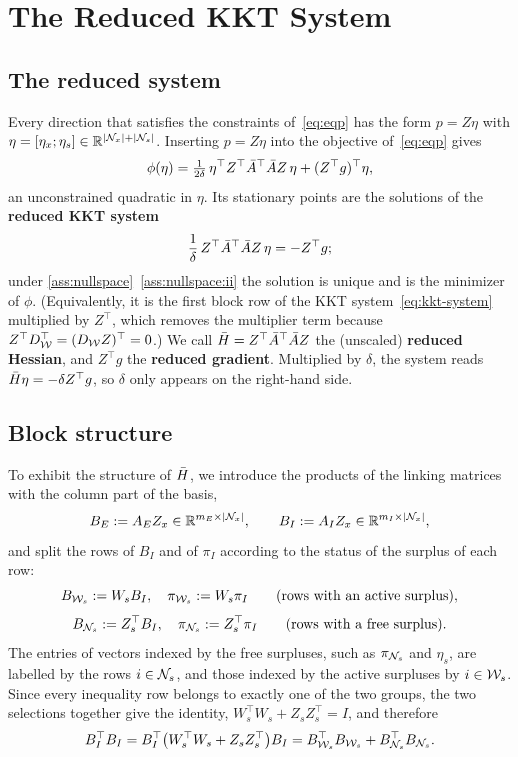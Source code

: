 \section{The Reduced KKT System}
\label{sec:reduced}

\subsection{The reduced system}

Every direction that satisfies the constraints of~\eqref{eq:eqp} has the form
$p = Z\eta$ with $\eta = [\eta_x;\eta_s]\in\mathbb{R}^{|\mathcal{N}_x|+|\mathcal{N}_s|}$. Inserting $p = Z\eta$ into the
objective of~\eqref{eq:eqp} gives
\[
\phi(\eta) = \tfrac{1}{2\delta}\,\eta^\top Z^\top\bar{A}^\top\bar{A} Z\,\eta + (Z^\top g)^\top\eta,
\]
an unconstrained quadratic in $\eta$. Its stationary points are the solutions of the
\textbf{reduced KKT system}
\begin{equation} \label{eq:reduced-system}
\frac{1}{\delta}\,Z^\top\bar{A}^\top\bar{A} Z\,\eta = -Z^\top g ;
\end{equation}
under \cref{ass:nullspace}~\ref{ass:nullspace:ii} the solution is unique and is the minimizer of $\phi$.
(Equivalently, it is the first block row of the KKT system~\eqref{eq:kkt-system} multiplied by
$Z^\top$, which removes the multiplier term because $Z^\top D_{\mathcal{W}}^\top = (D_{\mathcal{W}} Z)^\top = 0$.)
We call $\bar{H} = Z^\top\bar{A}^\top\bar{A} Z$ the (unscaled) \textbf{reduced Hessian}, and
$Z^\top g$ the \textbf{reduced gradient}. Multiplied by $\delta$, the system reads
$\bar{H}\eta = -\delta Z^\top g$, so $\delta$ only appears on the right-hand side.

\subsection{Block structure}

To exhibit the structure of $\bar{H}$, we introduce the products of the linking matrices with
the column part of the basis,
\[
B_E := A_E Z_x\in\mathbb{R}^{m_E\times|\mathcal{N}_x|},\qquad B_I := A_I Z_x\in\mathbb{R}^{m_I\times|\mathcal{N}_x|},
\]
and split the rows of $B_I$ and of $\pi_I$ according to the status of the surplus of each row:
\[
B_{\mathcal{W}_s} := W_s B_I,\quad \pi_{\mathcal{W}_s} := W_s\pi_I \qquad\text{(rows with an active surplus)},
\]
\[
B_{\mathcal{N}_s} := Z_s^\top B_I,\quad \pi_{\mathcal{N}_s} := Z_s^\top\pi_I \qquad\text{(rows with a free surplus)}.
\]
The entries of vectors indexed by the free surpluses, such as $\pi_{\mathcal{N}_s}$ and $\eta_s$, are
labelled by the rows $i\in\mathcal{N}_s$, and those indexed by the active surpluses by $i\in\mathcal{W}_s$.
Since every inequality row belongs to exactly one of the two groups, the two selections
together give the identity, $W_s^\top W_s + Z_sZ_s^\top = I$, and therefore
\begin{equation} \label{eq:BI-split}
B_I^\top B_I = B_I^\top\bigl(W_s^\top W_s + Z_sZ_s^\top\bigr)B_I
= B_{\mathcal{W}_s}^\top B_{\mathcal{W}_s} + B_{\mathcal{N}_s}^\top B_{\mathcal{N}_s} .
\end{equation}

